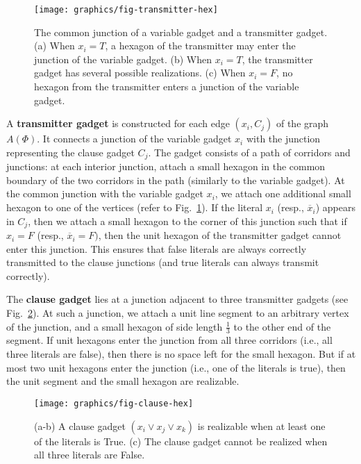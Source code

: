 \begin{figure}[htbp]
	\centering
	\texttt{[image: graphics/fig-transmitter-hex]}
	\caption{The common junction of a variable gadget and a transmitter gadget.
(a) When $x_i=T$, a hexagon of the transmitter may enter the junction of the variable gadget.
(b) When $x_i=T$, the transmitter gadget has several possible realizations.
(c) When $x_i=F$, no hexagon from the transmitter enters a junction of the variable gadget.}
	\label{fig:transmitter}
\end{figure}

A {\bf transmitter gadget} is constructed for each edge $(x_i,C_j)$ of the graph $A(\Phi)$.
It connects a junction of the variable gadget $x_i$ with the junction representing the clause gadget $C_j$. The gadget consists of a path of corridors and junctions: at each interior junction, attach a small hexagon in the common boundary of the two corridors in the path (similarly to the variable gadget). At the common junction with the variable gadget $x_i$, we attach one additional small hexagon to one of the vertices (refer to Fig.~\ref{fig:transmitter}). If the literal $x_i$ (resp., $\overline{x}_i$) appears in $C_j$, then we attach a small hexagon to the corner of this junction such that if $x_i=F$ (resp., $\overline{x}_i=F)$, then the unit hexagon of the transmitter gadget cannot enter this junction. This ensures that false literals are always correctly transmitted to the clause junctions (and true literals can always transmit correctly).

The {\bf clause gadget} lies at a junction adjacent to three transmitter gadgets (see Fig.~\ref{fig:clause}). At such a junction, we attach a unit line segment to an arbitrary vertex of the junction, and a small hexagon of side length $\frac{1}{3}$ to the other end of the segment. If unit hexagons enter the junction from all three corridors (i.e., all three literals are false), then there is no space left for the small hexagon. But if at most two unit hexagons enter the junction (i.e., one of the literals is true), then the unit segment and the small hexagon are realizable.

\begin{figure}[htbp]
	\centering
	\texttt{[image: graphics/fig-clause-hex]}
	\caption{(a-b) A clause gadget $(x_i\vee x_j\vee x_k)$ is
    realizable when at least one of the literals is {\sc True}.
    (c) The clause gadget cannot be realized when all three literals are {\sc False}.}
	\label{fig:clause}
\end{figure}

